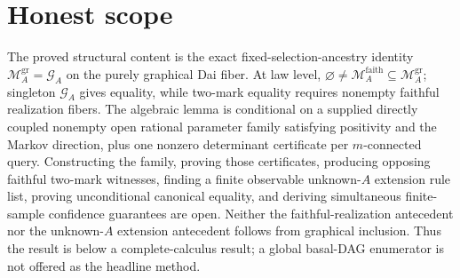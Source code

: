 \documentclass{article}
\begin{document}
\section{Honest scope}

The proved structural content is the exact fixed-selection-ancestry identity \(\mathcal M_A^{\mathrm{gr}}=\mathcal G_A\) on the purely graphical Dai fiber. At law level, \(\varnothing\ne\mathcal M_A^{\mathrm{faith}}\subseteq\mathcal M_A^{\mathrm{gr}}\); singleton \(\mathcal G_A\) gives equality, while two-mark equality requires nonempty faithful realization fibers. The algebraic lemma is conditional on a supplied directly coupled nonempty open rational parameter family satisfying positivity and the Markov direction, plus one nonzero determinant certificate per \(m\)-connected query. Constructing the family, proving those certificates, producing opposing faithful two-mark witnesses, finding a finite observable unknown-\(A\) extension rule list, proving unconditional canonical equality, and deriving simultaneous finite-sample confidence guarantees are open. Neither the faithful-realization antecedent nor the unknown-\(A\) extension antecedent follows from graphical inclusion. Thus the result is below a complete-calculus result; a global basal-DAG enumerator is not offered as the headline method.
\end{document}
